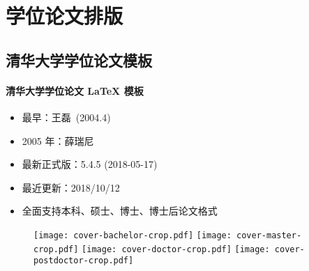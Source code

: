 \section{学位论文排版}
\subsection{\ThuThesis 清华大学学位论文模板}

\begin{frame}{\ThuThesis}
  \framesubtitle{清华大学学位论文 \LaTeX{} 模板}
  \begin{itemize}
  \item 最早：王磊~(2004.4)
  \item 2005 年：薛瑞尼
  \item 最新正式版：5.4.5 (2018-05-17)
  \item 最近更新：2018/10/12
  \item 全面支持本科、硕士、博士、博士后论文格式
  \end{itemize}
  \begin{figure}[htbp]
    \centering
    \texttt{[image: cover-bachelor-crop.pdf]}\hfill
    \texttt{[image: cover-master-crop.pdf]}\hfill
    \texttt{[image: cover-doctor-crop.pdf]}\hfill
    \texttt{[image: cover-postdoctor-crop.pdf]}
  \end{figure}
\end{frame}

